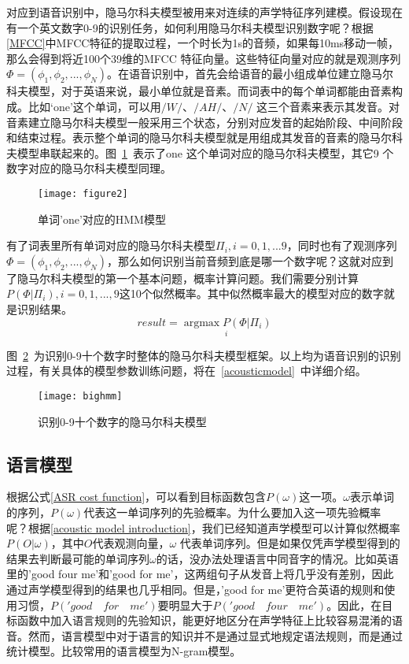 对应到语音识别中，隐马尔科夫模型被用来对连续的声学特征序列建模。假设现在有一个英文数字0-9的识别任务，如何利用隐马尔科夫模型识别数字呢？根据\ref{MFCC}中MFCC特征的提取过程，一个时长为1s的音频，如果每10ms移动一帧，那么会得到将近100个39维的MFCC 特征向量。这些特征向量对应的就是观测序列$\Phi=(\phi_1,\phi_2,...,\phi_N)$。在语音识别中，首先会给语音的最小组成单位建立隐马尔科夫模型，对于英语来说，最小单位就是音素。而词表中的每个单词都能由音素构成。比如‘one’这个单词，可以用$/W/$、$/AH/$、$/N/$ 这三个音素来表示其发音。对音素建立隐马尔科夫模型一般采用三个状态，分别对应发音的起始阶段、中间阶段和结束过程。表示整个单词的隐马尔科夫模型就是用组成其发音的音素的隐马尔科夫模型串联起来的。图~\ref{fig:figure2}~表示了one 这个单词对应的隐马尔科夫模型，其它9 个数字对应的隐马尔科夫模型同理。
\begin{figure}[htbp]
\centering
\texttt{[image: figure2]}
\caption{单词'one'对应的HMM模型}\label{fig:figure2}
\vspace{\baselineskip}
\end{figure}

有了词表里所有单词对应的隐马尔科夫模型$\Pi_i,i=0,1,...9$，同时也有了观测序列$\Phi=(\phi_1,\phi_2,...,\phi_N)$，那么如何识别当前音频到底是哪一个数字呢？这就对应到了隐马尔科夫模型的第一个基本问题，概率计算问题。我们需要分别计算$P(\Phi|\Pi_i), i=0,1,...,9$这10个似然概率。其中似然概率最大的模型对应的数字就是识别结果。\begin{equation}result=\underset{i}{\operatorname{argmax} P(\Phi|\Pi_i)} \end{equation}

图~\ref{fig:bighmm}~为识别0-9十个数字时整体的隐马尔科夫模型框架。以上均为语音识别的识别过程，有关具体的模型参数训练问题，将在~\ref{acousticmodel}~中详细介绍。
\begin{figure}[htbp]
\centering
\texttt{[image: bighmm]}
\caption{识别0-9十个数字的隐马尔科夫模型}\label{fig:bighmm}
\vspace{\baselineskip}
\end{figure}

\subsection{语言模型}
根据公式\ref{ASR cost function}，可以看到目标函数包含$P(\omega)$这一项。$\omega$表示单词的序列，$P(\omega)$代表这一单词序列的先验概率。为什么要加入这一项先验概率呢？根据\ref{acoustic model introduction}，我们已经知道声学模型可以计算似然概率$P(O|\omega)$，其中$O$代表观测向量，$\omega$ 代表单词序列。但是如果仅凭声学模型得到的结果去判断最可能的单词序列$\omega$的话，没办法处理语言中同音字的情况。比如英语里的'good four me'和'good for me'，这两组句子从发音上将几乎没有差别，因此通过声学模型得到的结果也几乎相同。但是，'good for me'更符合英语的规则和使用习惯，$P('good\quad for\quad me')$要明显大于$P('good\quad four\quad me')$。因此，在目标函数中加入语言规则的先验知识，能更好地区分在声学特征上比较容易混淆的语音。然而，语言模型中对于语言的知识并不是通过显式地规定语法规则，而是通过统计模型。比较常用的语言模型为N-gram模型。

